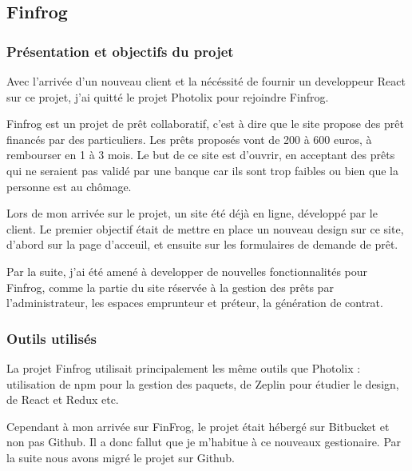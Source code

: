\documentclass[12pt,a4paper]{article}
\begin{document}
  \subsection{Finfrog}\label{finfrog}

  \subsubsection{Présentation et objectifs du
  projet}\label{pruxe9sentation-et-objectifs-du-projet-1}

  \bigskip

  Avec l'arrivée d'un nouveau client et la nécéssité de fournir un
  developpeur React sur ce projet, j'ai quitté le projet Photolix pour
  rejoindre Finfrog.

  \bigskip

  Finfrog est un projet de prêt collaboratif, c'est à dire que le site
  propose des prêt financés par des particuliers. Les prêts proposés vont
  de 200 à 600 euros, à rembourser en 1 à 3 mois. Le but de ce site est
  d'ouvrir, en acceptant des prêts qui ne seraient pas validé par une
  banque car ils sont trop faibles ou bien que la personne est au chômage.

  \bigskip

  Lors de mon arrivée sur le projet, un site été déjà en ligne, développé
  par le client. Le premier objectif était de mettre en place un nouveau
  design sur ce site, d'abord sur la page d'acceuil, et ensuite sur les
  formulaires de demande de prêt.

  \bigskip

  Par la suite, j'ai été amené à developper de nouvelles fonctionnalités
  pour Finfrog, comme la partie du site réservée à la gestion des prêts
  par l'administrateur, les espaces emprunteur et préteur, la génération
  de contrat.

  \subsubsection{Outils utilisés}\label{outils-utilisuxe9s-1}

  \bigskip

  La projet Finfrog utilisait principalement les même outils que Photolix
  : utilisation de npm pour la gestion des paquets, de Zeplin pour étudier
  le design, de React et Redux etc.

  \bigskip

  Cependant à mon arrivée sur FinFrog, le projet était hébergé sur
  Bitbucket et non pas Github. Il a donc fallut que je m'habitue à ce
  nouveaux gestionaire. Par la suite nous avons migré le projet sur
  Github.
\end{document}

